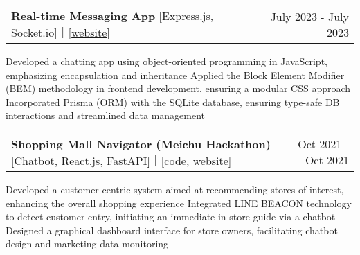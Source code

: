 \newcommand{\resumeProjEntry}[3]{
    \vspace{5pt}\item
      \begin{tabular*}{0.97\textwidth}{l@{\extracolsep{\fill}}r}
        \textbf{#1} #2 & \small #3\\
      \end{tabular*}\vspace{-5pt}
}

\resumeProjEntry
{Real-time Messaging App}
{[Express.js, Socket.io]｜[\href{https://fse-chat.glitch.me}{website}]}
{July 2023 - July 2023}
{
    \resumeItemListStart
        \resumeItem
        {Developed a chatting app using object-oriented programming in JavaScript, emphasizing encapsulation and inheritance}
        \resumeItem
        {Applied the Block Element Modifier (BEM) methodology in frontend development, ensuring a modular CSS approach}
        \resumeItem
        {Incorporated Prisma (ORM) with the SQLite database, ensuring type-safe DB interactions and streamlined data management}
    \resumeItemListEnd
}

\resumeProjEntry
{Shopping Mall Navigator (Meichu Hackathon)}
{[Chatbot, React.js, FastAPI]｜[\href{https://github.com/OscarShiang/meichu-stack}{code}, \href{https://line-tv.kuouu.tw}{website}]}
{Oct 2021 - Oct 2021}
{
    \resumeItemListStart
        \resumeItem
        {Developed a customer-centric system aimed at recommending stores of interest, enhancing the overall shopping experience}
        \resumeItem
        {Integrated LINE BEACON technology to detect customer entry, initiating an immediate in-store guide via a chatbot}
        \resumeItem
        {Designed a graphical dashboard interface for store owners, facilitating chatbot design and marketing data monitoring}
    \resumeItemListEnd
}



